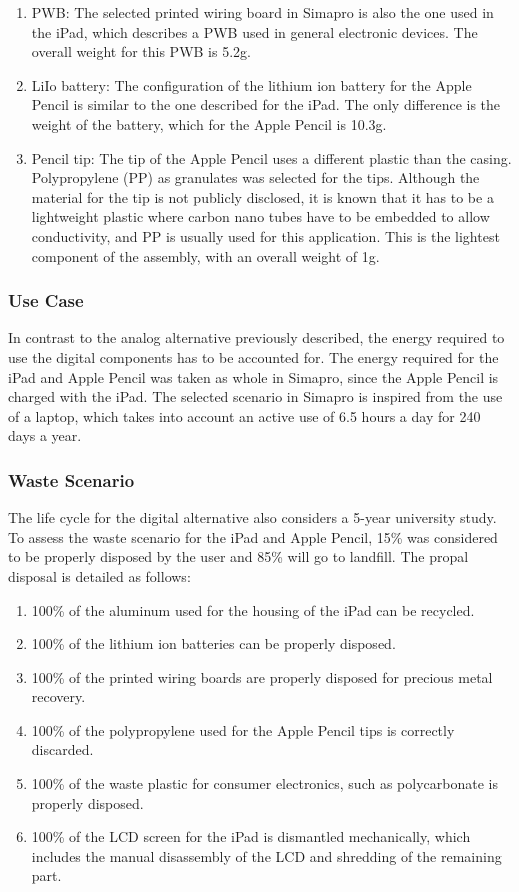 \begin{enumerate}
\begin{enumerate}
        \item PWB: The selected printed wiring board in Simapro is also the one used in the iPad, which describes a PWB used in general electronic devices. The overall weight for this PWB is 5.2g. 
        \item LiIo battery: The configuration of the lithium ion battery for the Apple Pencil is similar to the one described for the iPad. The only difference is the weight of the battery, which for the Apple Pencil is 10.3g. 
        \item Pencil tip: The tip of the Apple Pencil uses a different plastic than the casing. Polypropylene (PP) as granulates was selected for the tips. Although the material for the tip is not publicly disclosed, it is known that it has to be a lightweight plastic where carbon nano tubes have to be embedded to allow conductivity, and PP is usually used for this application. This is the lightest component of the assembly, with an overall weight of 1g.  
    \end{enumerate}
\end{enumerate}

\subsubsection*{Use Case}
In contrast to the analog alternative previously described, the energy required to use the digital components has to be accounted for. The energy required for the iPad and Apple Pencil was taken as whole in Simapro, since the Apple Pencil is charged with the iPad. The selected scenario in Simapro is inspired from the use of a laptop, which takes into account an active use of 6.5 hours a day for 240 days a year. 

\subsubsection*{Waste Scenario}
The life cycle for the digital alternative also considers a 5-year university study. To assess the waste scenario for the iPad and Apple Pencil, 15\% was considered to be properly disposed by the user and 85\% will go to landfill. The propal disposal is detailed as follows:

\begin{enumerate}
    \item 100\% of the aluminum used for the housing of the iPad can be recycled. 
    \item 100\% of the lithium ion batteries can be properly disposed. 
    \item 100\% of the printed wiring boards are properly disposed for precious metal recovery. 
    \item 100\% of the polypropylene used for the Apple Pencil tips is correctly discarded. 
    \item 100\% of the waste plastic for consumer electronics, such as polycarbonate is properly disposed. 
    \item 100\% of the LCD screen for the iPad is dismantled mechanically, which includes the manual disassembly of the LCD and shredding of the remaining part. 
\end{enumerate}

